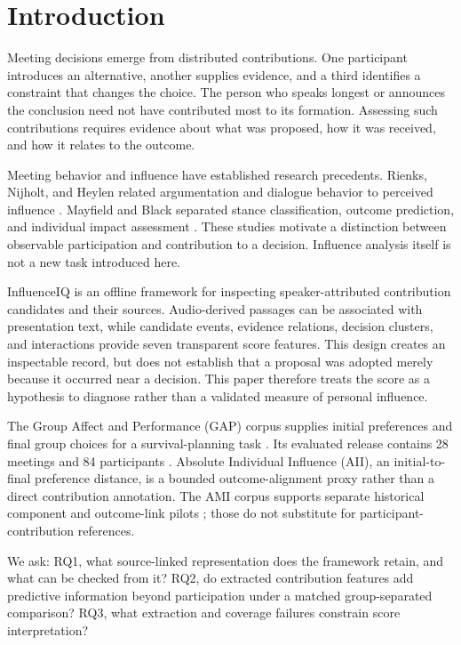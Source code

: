 \documentclass[journal]{IEEEtran}
\begin{document}
\section{Introduction}
Meeting decisions emerge from distributed contributions. One participant introduces an alternative, another supplies evidence, and a third identifies a constraint that changes the choice. The person who speaks longest or announces the conclusion need not have contributed most to its formation. Assessing such contributions requires evidence about what was proposed, how it was received, and how it relates to the outcome.

Meeting behavior and influence have established research precedents. Rienks, Nijholt, and Heylen related argumentation and dialogue behavior to perceived influence \cite{ref1}. Mayfield and Black separated stance classification, outcome prediction, and individual impact assessment \cite{ref2}. These studies motivate a distinction between observable participation and contribution to a decision. Influence analysis itself is not a new task introduced here.

InfluenceIQ is an offline framework for inspecting speaker-attributed contribution candidates and their sources. Audio-derived passages can be associated with presentation text, while candidate events, evidence relations, decision clusters, and interactions provide seven transparent score features. This design creates an inspectable record, but does not establish that a proposal was adopted merely because it occurred near a decision. This paper therefore treats the score as a hypothesis to diagnose rather than a validated measure of personal influence.

The Group Affect and Performance (GAP) corpus supplies initial preferences and final group choices for a survival-planning task \cite{ref3}. Its evaluated release contains 28 meetings and 84 participants \cite{ref4}. Absolute Individual Influence (AII), an initial-to-final preference distance, is a bounded outcome-alignment proxy rather than a direct contribution annotation. The AMI corpus supports separate historical component and outcome-link pilots \cite{ref5}; those do not substitute for participant-contribution references.

We ask: RQ1, what source-linked representation does the framework retain, and what can be checked from it? RQ2, do extracted contribution features add predictive information beyond participation under a matched group-separated comparison? RQ3, what extraction and coverage failures constrain score interpretation?
\end{document}
